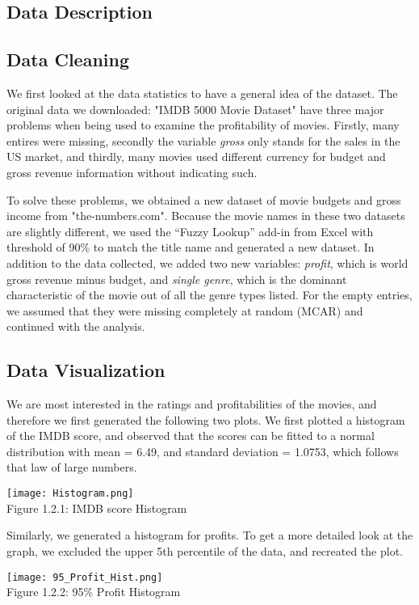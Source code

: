 \documentclass[12pt]{article}
\begin{document}
\begin{multicols}{2}
\section{Data Description}

\subsection{Data Cleaning}
\bigskip
We first looked at the data statistics to have a general idea of the dataset. The original data we downloaded: "IMDB 5000 Movie Dataset" have three major problems when being used to examine the profitability of movies. Firstly, many entires were missing, secondly the variable \textit{gross} only stands for the sales in the US market, and thirdly, many movies used different currency for budget and gross revenue information without indicating such. \par
To solve these problems, we obtained a new dataset of movie budgets and gross income from "the-numbers.com". Because the movie names in these two datasets are slightly different,  we used the “Fuzzy Lookup” add-in from Excel with threshold of 90\% to match the title name and generated a new dataset. In addition to the data collected, we added two new variables: \textit{profit}, which is world gross revenue minus budget, and \textit{single genre}, which is the dominant characteristic of the movie out of all the genre types listed. For the empty entries, we assumed that they were missing completely at random (MCAR) and continued with the analysis. 
\par
\bigskip
\subsection{Data Visualization}
\bigskip
We are most interested in the ratings and profitabilities of the movies, and therefore we first generated the following two plots. We first plotted a histogram of the IMDB score, and observed that the scores can be fitted to a normal distribution with mean = 6.49, and standard deviation = 1.0753, which follows that law of large numbers. 
\begin{center}
\texttt{[image: Histogram.png]}\\
\footnotesize Figure 1.2.1: IMDB score Histogram 
\end{center}

Similarly, we generated a histogram for profits. To get a more detailed look at the graph, we excluded the upper 5th percentile of the data, and recreated the plot. \par
\begin{center}
\texttt{[image: 95\_Profit\_Hist.png]}\\
\footnotesize Figure 1.2.2: 95\% Profit Histogram
\end{center}



\end{multicols}
\end{document}
